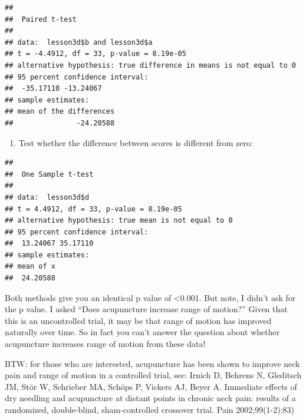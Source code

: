 \documentclass[]{book}
\newenvironment{Shaded}{\begin{snugshade}}{\end{snugshade}}
\newcommand{\DataTypeTok}[1]{\textcolor[rgb]{0.13,0.29,0.53}{#1}}
\newcommand{\DecValTok}[1]{\textcolor[rgb]{0.00,0.00,0.81}{#1}}
\newcommand{\KeywordTok}[1]{\textcolor[rgb]{0.13,0.29,0.53}{\textbf{#1}}}
\newcommand{\NormalTok}[1]{#1}
\newcommand{\OperatorTok}[1]{\textcolor[rgb]{0.81,0.36,0.00}{\textbf{#1}}}
\newcommand{\OtherTok}[1]{\textcolor[rgb]{0.56,0.35,0.01}{#1}}
\providecommand{\tightlist}{%
  \setlength{\itemsep}{0pt}\setlength{\parskip}{0pt}}
\begin{document}
\begin{Shaded}
\end{Shaded}

\begin{verbatim}
## 
##  Paired t-test
## 
## data:  lesson3d$b and lesson3d$a
## t = -4.4912, df = 33, p-value = 8.19e-05
## alternative hypothesis: true difference in means is not equal to 0
## 95 percent confidence interval:
##  -35.17110 -13.24067
## sample estimates:
## mean of the differences 
##               -24.20588
\end{verbatim}

\begin{enumerate}
\def\labelenumi{\arabic{enumi})}
\setcounter{enumi}{1}
\tightlist
\item
  Test whether the difference between scores is different from zero:
\end{enumerate}

\begin{Shaded}
\end{Shaded}

\begin{verbatim}
## 
##  One Sample t-test
## 
## data:  lesson3d$d
## t = 4.4912, df = 33, p-value = 8.19e-05
## alternative hypothesis: true mean is not equal to 0
## 95 percent confidence interval:
##  13.24067 35.17110
## sample estimates:
## mean of x 
##  24.20588
\end{verbatim}

Both methods give you an identical p value of \textless0.001. But note,
I didn't ask for the p value. I asked ``Does acupuncture increase range
of motion?'' Given that this is an uncontrolled trial, it may be that
range of motion has improved naturally over time. So in fact you can't
answer the question about whether acupuncture increases range of motion
from these data!

BTW: for those who are interested, acupuncture has been shown to improve
neck pain and range of motion in a controlled trial, see: Irnich D,
Behrens N, Gleditsch JM, Stör W, Schrieber MA, Schöps P, Vickers AJ,
Beyer A. Immediate effects of dry needling and acupuncture at distant
points in chronic neck pain: results of a randomized, double-blind,
sham-controlled crossover trial. Pain 2002;99(1-2):83)
\end{document}
